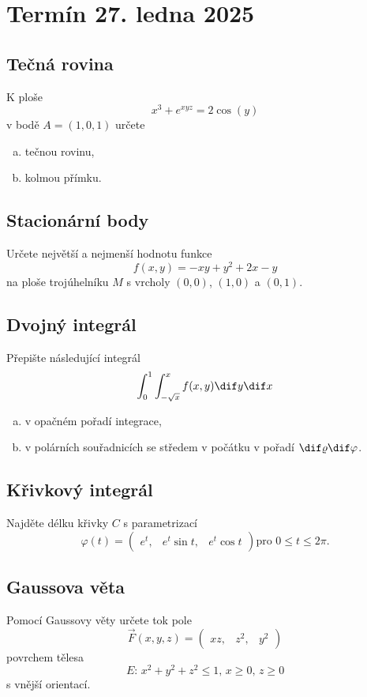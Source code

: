 \section{Termín 27. ledna 2025}

\subsection{Tečná rovina}
K ploše
\[
    x^3 + e^{xyz} = 2 \cos(y)
\]
v bodě $A = (1, 0, 1)$ určete
\begin{enumerate}[(a),noitemsep]
    \item tečnou rovinu,
    \item kolmou přímku.
\end{enumerate}

\subsection{Stacionární body}
Určete největší a nejmenší hodnotu funkce
\[
    f(x,y) = -xy + y^2 + 2x - y
\]
na ploše trojúhelníku $M$ s vrcholy $(0, 0)$, $(1, 0)$ a $(0, 1)$.

\subsection{Dvojný integrál}
Přepište následující integrál
\[
    \int_{0}^{1} \int_{-\sqrt{x}}^{x} f(x, y) \dif y \dif x
\]
\begin{enumerate}[a), noitemsep]
    \item v opačném pořadí integrace,
    \item v polárních souřadnicích se středem v počátku v pořadí $\dif \varrho \dif \varphi$.
\end{enumerate}

\subsection{Křivkový integrál}
Najděte délku křivky $C$ s parametrizací
\[
    \varphi(t) = 
    \begin{pmatrix}
        e^t, & e^t \sin t, & e^t \cos t
    \end{pmatrix} \text{pro } 0 \leq t \leq 2 \pi.
\]

\subsection{Gaussova věta}
Pomocí Gaussovy věty určete tok pole
\[
    \vec{F}(x, y, z) =
    \begin{pmatrix}
        xz, & z^2, & y^2
    \end{pmatrix}
\]
povrchem tělesa
\[
    E \text{: } x^2 + y^2 + z^2 \leq 1 \text{, } x \geq 0 \text{, } z \geq 0
\]
s vnější orientací.